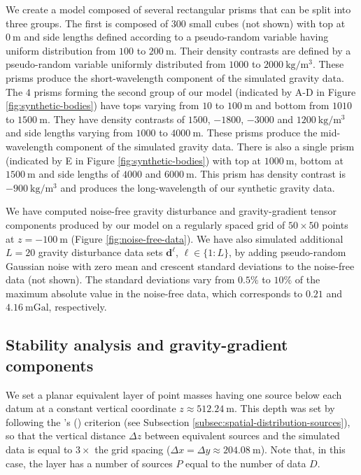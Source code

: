 We create a model composed of several rectangular prisms that can be split into three groups.
The first is composed of $300$ small cubes (not shown) with top at $0 \: \mathrm{m}$ and side lengths
defined according to a pseudo-random variable having uniform distribution from 
$100$ to $200 \: \mathrm{m}$.
Their density contrasts are defined by a pseudo-random variable uniformly distributed
from $1000$ to $2000 \: \mathrm{kg / m^{3}}$.
These prisms produce the short-wavelength component of the simulated gravity data.
The $4$ prisms forming the second group of our model (indicated by A-D in Figure \ref{fig:synthetic-bodies}) 
have tops varying from $10$ to $100 \: \mathrm{m}$ and bottom from $1010$ to $1500 \: \mathrm{m}$.
They have density contrasts of $1500$, $-1800$, $-3000$ and $1200  \: \mathrm{kg / m^{3}}$
and side lengths varying from $1000$ to $4000 \: \mathrm{m}$.
These prisms produce the mid-wavelength component of the simulated gravity data.
There is also a single prism (indicated by E in Figure \ref{fig:synthetic-bodies}) 
with top at $1000 \: \mathrm{m}$, bottom at 
$1500 \: \mathrm{m}$ and side lengths of $4000$ and $6000 \: \mathrm{m}$.
This prism has density contrast is $-900 \: \mathrm{kg / m^{3}}$ and produces the
long-wavelength of our synthetic gravity data.

We have computed noise-free gravity disturbance and gravity-gradient tensor components 
produced by our model on a regularly spaced grid of $50 \times 50$ points at 
$z = -100 \: \mathrm{m}$ (Figure \ref{fig:noise-free-data}).
We have also simulated additional $L = 20$ gravity disturbance data sets $\mathbf{d}^{\ell}$, $\ell \in \{1:L\}$, 
by adding pseudo-random Gaussian noise with zero mean and crescent standard deviations to the noise-free data (not shown).
The standard deviations vary from $0.5\%$ to $10\%$ of the maximum absolute value in the noise-free data,
which corresponds to $0.21$ and $4.16 \: \mathrm{mGal}$, respectively.

\subsection{Stability analysis and gravity-gradient components}

We set a planar equivalent layer of point masses having one source below each datum at a constant vertical coordinate $z \approx 512.24 \: \mathrm{m}$.
This depth was set by following the \citeauthor{dampney1969}'s (\citeyear{dampney1969}) criterion (see Subsection \ref{subsec:spatial-distribution-sources}),
so that the vertical distance $\Delta z$ between equivalent sources and the simulated data is equal to $3 \times$ the grid spacing 
($\Delta x = \Delta y \approx 204.08 \: \mathrm{m} $).
Note that, in this case, the layer has a number of sources $P$ equal to the number of data $D$.

